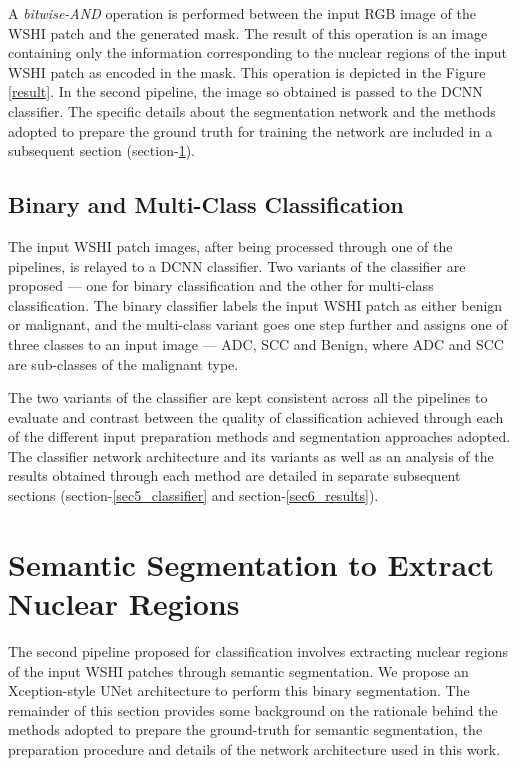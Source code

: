 \documentclass{comjnl}
\begin{document}
A \emph{bitwise-AND} operation is performed between the input RGB image of the WSHI patch and the generated mask. The result of this operation is an image containing only the information corresponding to the nuclear regions of the input WSHI patch as encoded in the mask. This operation is depicted in the Figure \ref{result}. In the second pipeline, the image so obtained is passed to the DCNN classifier. The specific details about the segmentation network and the methods adopted to prepare the ground truth for training the network are included in a subsequent section (section-\ref{sec4_segmentation}).

\subsection{Binary and Multi-Class Classification}

The input WSHI patch images, after being processed through one of the pipelines, is relayed to a DCNN classifier. Two variants of the classifier are proposed --- one for binary classification and the other for multi-class classification. The binary classifier labels the input WSHI patch as either benign or malignant, and the multi-class variant goes one step further and assigns one of three classes to an input image --- ADC, SCC and Benign, where ADC and SCC are sub-classes of the malignant type.

The two variants of the classifier are kept consistent across all the pipelines to evaluate and contrast between the quality of classification achieved through each of the different input preparation methods and segmentation approaches adopted. The classifier network architecture and its variants as well as an analysis of the results obtained through each method are detailed in separate subsequent sections (section-\ref{sec5_classifier} and section-\ref{sec6_results}).

\section{Semantic Segmentation to Extract Nuclear Regions}
\label{sec4_segmentation}
The second pipeline proposed for classification involves extracting nuclear regions of the input WSHI patches through semantic segmentation. We propose an Xception-style UNet architecture to perform this binary segmentation. The remainder of this section provides some background on the rationale behind the methods adopted to prepare the ground-truth for semantic segmentation, the preparation procedure and details of the network architecture used in this work.
\end{document}
